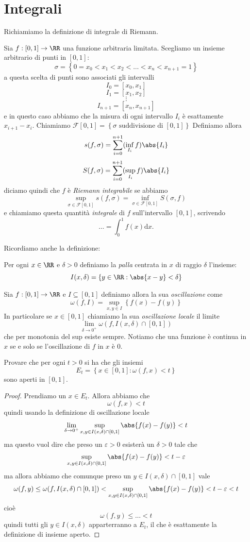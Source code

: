 \documentclass[11pt]{scrartcl}
\newcommand{\dif}{\text{d}}
\begin{document}
	 \section{Integrali}
	 Richiamiamo la definizione di integrale di Riemann. 
	 \begin{definition}
	 	Sia $f:[0,1]\to\RR$ una funzione arbitraria limitata. Scegliamo un insieme arbitrario di punti in $[0,1]$:
	 	$$\sigma=\left\{0=x_0<x_1<x_2<\dots<x_n<x_{n+1}=1\right\}$$
	 	a questa scelta di punti sono associati gli intervalli 
	 	$$I_0=[x_0,x_1]$$
	 	$$I_1=[x_1,x_2]$$
	 	$$\vdots$$
	 	$$I_{n+1}=[x_n,x_{n+1}]$$
	 	e in questo caso abbiamo che la misura di ogni intervallo $I_i$ è esattamente $x_{i+1}-x_i$. Chiamiamo 
	 	$\mathcal{F}[0,1]=\left\{\sigma \text{ suddivisione di $[0,1]$}\right\}$
	 	Definiamo allora
	 	$$s(f,\sigma)=\sum_{i=0}^{n+1}(\inf_{I_i} f)\abs{I_i}$$
	 	$$S(f,\sigma)=\sum_{i=0}^{n+1}(\sup_{I_i} f)\abs{I_i}$$
	 	diciamo quindi che $f$ è \textit{Riemann integrabile} se abbiamo
	 	$$\sup_{\sigma\in \mathcal{F}[0,1]}s(f,\sigma)=\inf_{\sigma\in \mathcal{F}[0,1]}S(\sigma,f)$$
	 	e chiamiamo questa quantità \textit{integrale} di $f$ sull'intervallo $[0,1]$, scrivendo
	 	$$\dots=\int_0^1 f(x)\dif x.$$
	 \end{definition}
	 Ricordiamo anche la definizione:
	 \begin{definition}[Palla]
	 	Per ogni $x\in \RR$ e $\delta>0$ definiamo la \textit{palla} centrata in $x$ di raggio $\delta$ l'insieme:
	 	$$I(x,\delta)=\left\{y\in\RR:\abs{x-y}<\delta\right\}$$
	 \end{definition}
	 \begin{definition}[Oscillazione]
	 	Sia $f:[0,1]\to\RR$ e $I\subseteq [0,1]$ definiamo allora la sua \textit{oscillazione} come
	 	$$\omega(f,I)=\sup_{x,y\in I}\left\{f(x)-f(y)\right\}$$
	 	In particolare se $x\in [0,1]$ chiamiamo la sua \textit{oscillazione locale} il limite
	 	$$\lim_{\delta\to 0^+}\omega(f,I(x,\delta)\cap[0,1])$$
	 	che per monotonia del sup esiste sempre. Notiamo che una funzione è continua in $x$ se e solo se l'oscillazione di $f$ in $x$ è $0$.
	 \end{definition}
	 \begin{exercise}
	 	Provare che per ogni $t>0$ si ha che gli insiemi 
	 	$$E_t=\left\{x\in [0,1]:\omega(f,x)<t\right\}$$
	 	sono aperti in $[0,1]$.
	 \end{exercise}
	 \begin{proof}
	 	Prendiamo un $x\in E_t$. Allora abbiamo che 
	 	$$\omega(f,x)<t$$
	 	quindi usando la definizione di oscillazione locale
	 	$$\lim_{\delta\to 0^+}\sup_{x,y\in I(x,\delta)\cap [0,1]}\abs{f(x)-f(y)}<t$$
	 	ma questo vuol dire che preso un $\varepsilon>0$ esisterà un $\delta>0$ tale che 
	 	$$\sup_{x,y\in I(x,\delta)\cap [0,1]}\abs{f(x)-f(y)}<t-\varepsilon$$
	 	ma allora abbiamo che comunque preso un $y\in I(x,\delta)\cap [0,1]$ vale 
	 	$$\omega(f,y)\le \omega(f,I(x,\delta)\cap [0,1])< \sup_{x,y\in I(x,\delta)\cap [0,1]}\abs{f(x)-f(y)}<t-\varepsilon<t$$
	 	cioè 
	 	$$\omega(f,y)\le \dots < t$$
	 	quindi tutti gli $y\in I(x,\delta)$ apparterranno a $E_t$, il che è esattamente la definizione di insieme aperto. 
	 \end{proof}
\end{document}
